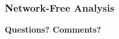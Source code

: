 \documentclass[t,handout]{beamer}
\begin{document}
\begin{frame}
\frametitle{Network-Free Analysis}

\end{frame}


%
%
%
%
%

%

\begin{frame}[c]
\begin{center}
\textbf{Questions? Comments?}
\end{center}
\end{frame}

%
\end{document}
